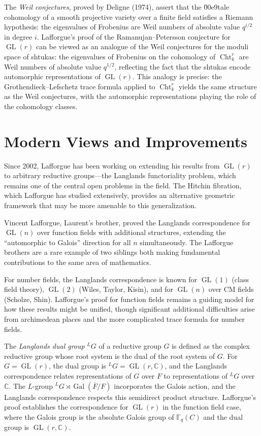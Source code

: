 The \emph{Weil conjectures}, proved by Deligne (1974), assert that the \u00e9tale cohomology of a smooth projective variety over a finite field satisfies a Riemann hypothesis: the eigenvalues of Frobenius are Weil numbers of absolute value $q^{i/2}$ in degree $i$. Lafforgue's proof of the Ramanujan--Petersson conjecture for $\operatorname{GL}(r)$ can be viewed as an analogue of the Weil conjectures for the moduli space of shtukas: the eigenvalues of Frobenius on the cohomology of $\operatorname{Cht}^r_k$ are Weil numbers of absolute value $q^{1/2}$, reflecting the fact that the shtukas encode automorphic representations of $\operatorname{GL}(r)$. This analogy is precise: the Grothendieck--Lefschetz trace formula applied to $\operatorname{Cht}^r_k$ yields the same structure as the Weil conjectures, with the automorphic representations playing the role of the cohomology classes.

\section{Modern Views and Improvements}

Since 2002, Lafforgue has been working on extending his results from $\operatorname{GL}(r)$ to arbitrary reductive groups---the Langlands functoriality problem, which remains one of the central open problems in the field. The Hitchin fibration, which Lafforgue has studied extensively, provides an alternative geometric framework that may be more amenable to this generalization.

Vincent Lafforgue, Laurent's brother, proved the Langlands correspondence for $\operatorname{GL}(n)$ over function fields with additional structures, extending the ``automorphic to Galois'' direction for all $n$ simultaneously. The Lafforgue brothers are a rare example of two siblings both making fundamental contributions to the same area of mathematics.

For number fields, the Langlands correspondence is known for $\operatorname{GL}(1)$ (class field theory), $\operatorname{GL}(2)$ (Wiles, Taylor, Kisin), and for $\operatorname{GL}(n)$ over CM fields (Scholze, Shin). Lafforgue's proof for function fields remains a guiding model for how these results might be unified, though significant additional difficulties arise from archimedean places and the more complicated trace formula for number fields.

The \emph{Langlands dual group} ${}^L G$ of a reductive group $G$ is defined as the complex reductive group whose root system is the dual of the root system of $G$. For $G = \operatorname{GL}(r)$, the dual group is ${}^L G = \operatorname{GL}(r, \mathbb{C})$, and the Langlands correspondence relates representations of $G$ over $F$ to representations of ${}^L G$ over $\mathbb{C}$. The $L$-group ${}^L G \rtimes \operatorname{Gal}(\overline{F}/F)$ incorporates the Galois action, and the Langlands correspondence respects this semidirect product structure. Lafforgue's proof establishes the correspondence for $\operatorname{GL}(r)$ in the function field case, where the Galois group is the absolute Galois group of $\mathbb{F}_q(C)$ and the dual group is $\operatorname{GL}(r, \mathbb{C})$.


